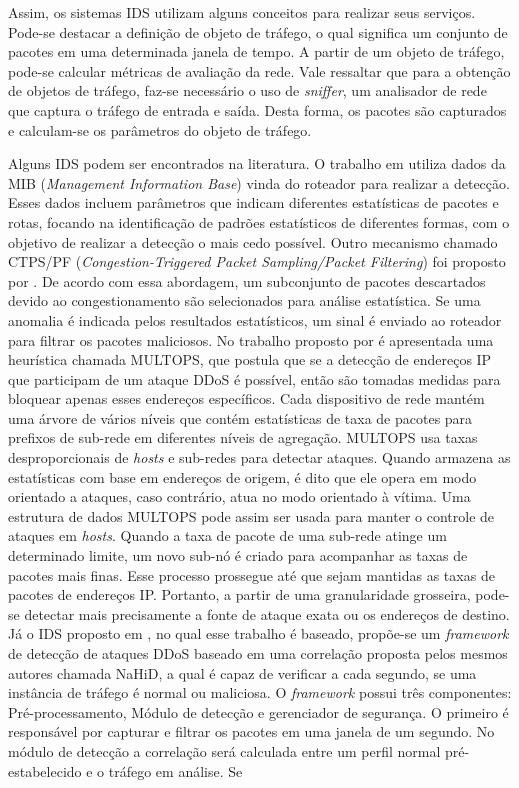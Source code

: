 Assim, os sistemas IDS utilizam alguns conceitos para realizar seus serviços. Pode-se destacar a definição de objeto de tráfego, o qual significa um conjunto de pacotes em uma determinada janela de tempo. A partir de um objeto de tráfego, pode-se calcular métricas de avaliação da rede. Vale ressaltar que para a obtenção de objetos de tráfego, faz-se necessário o uso de \textit{sniffer}, um analisador de rede que captura o tráfego de entrada e saída. Desta forma, os pacotes são capturados e calculam-se os parâmetros do objeto de tráfego.

Alguns IDS podem ser encontrados na literatura. O trabalho em \cite{cabrera2001proactive} utiliza dados da MIB (\textit{Management Information Base}) vinda do roteador para realizar a detecção. Esses dados incluem parâmetros que indicam diferentes estatísticas de pacotes e rotas, focando na identificação de padrões estatísticos de diferentes formas, com o objetivo de realizar a detecção o mais cedo possível. Outro mecanismo chamado CTPS/PF (\textit{Congestion-Triggered Packet Sampling/Packet Filtering}) foi proposto por \cite{huang2001countering}. De acordo com essa abordagem, um subconjunto de pacotes descartados devido ao congestionamento são selecionados para análise estatística. Se uma anomalia é indicada pelos resultados estatísticos, um sinal é enviado ao roteador para filtrar os pacotes maliciosos. No trabalho proposto por  é apresentada uma heurística chamada MULTOPS, que postula que se a detecção de endereços IP que participam de um ataque DDoS é possível, então são tomadas medidas para bloquear apenas esses endereços específicos. Cada dispositivo de rede mantém uma árvore de vários níveis que contém estatísticas de taxa de pacotes para prefixos de sub-rede em diferentes níveis de agregação. MULTOPS usa taxas desproporcionais de \textit{hosts} e sub-redes para detectar ataques. Quando armazena as estatísticas com base em endereços de origem, é dito que ele opera em modo orientado a ataques, caso contrário, atua no modo orientado à vítima. Uma estrutura de dados MULTOPS pode assim ser usada para manter o controle de ataques em \textit{hosts}. Quando a taxa de pacote de uma sub-rede atinge um determinado limite, um novo sub-nó é criado para acompanhar as taxas de pacotes mais finas. Esse processo prossegue até que sejam mantidas as taxas de pacotes de endereços IP. Portanto, a partir de uma granularidade grosseira, pode-se detectar mais precisamente a fonte de ataque exata ou os endereços de destino. Já o IDS proposto em , no qual esse trabalho é baseado,  propõe-se um \textit{framework} de detecção de ataques DDoS baseado em uma correlação proposta pelos mesmos autores chamada NaHiD, a qual é capaz de verificar a cada segundo, se uma instância de tráfego é normal ou maliciosa. O \textit{framework} possui três componentes: Pré-processamento, Módulo de detecção e gerenciador de segurança. O primeiro é responsável por capturar e filtrar os pacotes em uma janela de um segundo. No módulo de detecção a correlação será calculada entre um perfil normal pré-estabelecido e o tráfego  em análise. Se 
